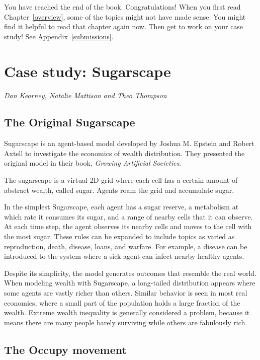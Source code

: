 \documentclass[10pt]{book}
\begin{document}
You have reached the end of the book.  Congratulations!  When you
first read Chapter~\ref{overview}, some of the topics might not have
made sense.  You might find it helpful to read that chapter again now.
Then get to work on your case study!  See Appendix~\ref{submissions}.

\chapter{Case study: Sugarscape}

{\em Dan Kearney, Natalie Mattison and Theo Thompson}

\section{The Original Sugarscape}

Sugarscape is an agent-based model developed by Joshua M. Epstein and
Robert Axtell to investigate the economics of wealth distribution.
They presented the original model in their book,
{\it Growing Artificial Societies}.

The sugarscape is a virtual 2D grid where each cell has a certain
amount of abstract wealth, called sugar.  Agents roam the grid
and accumulate sugar.

In the simplest Sugarscape, each agent has a sugar reserve, a
metabolism at which rate it consumes its sugar, and a range of nearby
cells that it can observe.  At each time step, the agent observes its
nearby cells and moves to the cell with the most sugar. These rules
can be expanded to include topics as varied as reproduction, death,
disease, loans, and warfare. For example, a disease can be introduced
to the system where a sick agent can infect nearby healthy agents.

Despite its simplicity, the model generates outcomes that resemble the
real world. When modeling wealth with Sugarscape, a long-tailed
distribution appears where some agents are vastly richer than others.
Similar behavior is seen in most real economies, where a small part of
the population holds a large fraction of the wealth.  Extreme wealth
inequality is generally considered a problem, because it means there
are many people barely surviving while others are fabulously rich.

\section{The Occupy movement}
\end{document}
